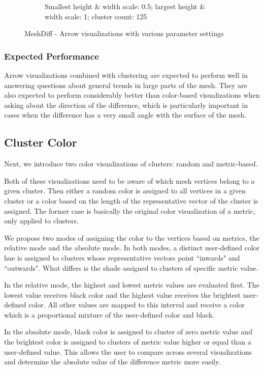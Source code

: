 \begin{figure}[h]
\begin{subfigure}{0.3\textwidth}
    \caption{Smallest height \& width scale: \(0.5\); largest height \& width scale: 1; cluster count: 125}
    \label{fig:meshdiff_arrows_1-125}
	\end{subfigure}
\caption{MeshDiff - Arrow visualizations with various parameter settings}
\end{figure}

\subsubsection{Expected Performance}

Arrow visualizations combined with clustering are expected to perform well in answering questions about general trends in large parts of the mesh. They are also expected to perform considerably better than color-based visualizations when asking about the direction of the difference, which is particularly important in cases when the difference has a very small angle with the surface of the mesh.
\subsection{Cluster Color}

Next, we introduce two color visualizations of clusters: random and metric-based.

Both of these visualizations need to be aware of which mesh vertices belong to a given cluster. Then either a random color is assigned to all vertices in a given cluster or a color based on the length of the representative vector of the cluster is assigned. The former case is basically the original color visualization of a metric, only applied to clusters.

We propose two modes of assigning the color to the vertices based on metrics, the relative mode and the absolute mode. In both modes, a distinct user-defined color hue is assigned to clusters whose representative vectors point ``inwards" and ``outwards". What differs is the shade assigned to clusters of specific metric value.

In the relative mode, the highest and lowest metric values are evaluated first. The lowest value receives black color and the highest value receives the brightest user-defined color. All other values are mapped to this interval and receive a color which is a proportional mixture of the user-defined color and black.

In the absolute mode, black color is assigned to cluster of zero metric value and the brightest color is assigned to clusters of metric value higher or equal than a user-defined value. This allows the user to compare across several visualizations and determine the absolute value of the difference metric more easily.

